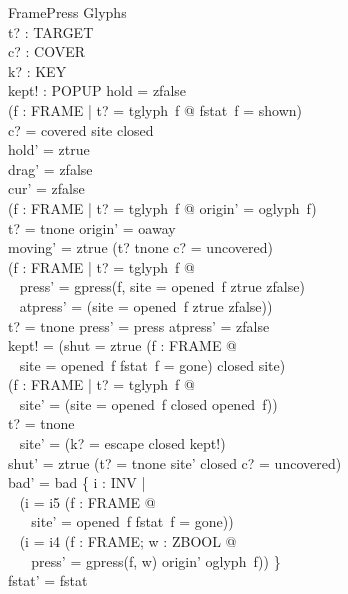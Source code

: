 \documentclass[a4paper,10pt,fleqn]{article}
\begin{document}
\begin{schema}{FramePress}
  \Delta Glyphs \\
  t? : TARGET \\
  c? : COVER \\
  k? : KEY \\
  kept! : POPUP
\where
  hold = zfalse \\
  (\forall f : FRAME | t? = tglyph~f @ fstat~f = shown) \\
  c? = covered \implies site \neq closed \\
  hold' = ztrue \\
  drag' = zfalse \\
  cur' = zfalse \\
  (\forall f : FRAME | t? = tglyph~f @ origin' = oglyph~f) \\
  t? = tnone \implies origin' = oaway \\
  moving' = ztrue \iff (t? \neq tnone \land c? = uncovered) \\
  (\forall f : FRAME | t? = tglyph~f @ \\
  \quad~ press' = gpress(f, \IF site = opened~f \THEN ztrue \ELSE zfalse) \\
  \quad~ \land atpress' = (\IF site = opened~f \THEN ztrue \ELSE zfalse)) \\
  t? = tnone \implies press' = press \land atpress' = zfalse \\
  kept! = (\IF shut = ztrue \lor (\exists f : FRAME @ \\
  \quad~ site = opened~f \land fstat~f = gone) \THEN closed \ELSE site) \\
  (\forall f : FRAME | t? = tglyph~f @ \\
  \quad~ site' = (\IF site = opened~f \THEN closed \ELSE opened~f)) \\
  t? = tnone \implies \\
  \quad~ site' = (\IF k? = escape \THEN closed \ELSE kept!) \\
  shut' = ztrue \iff (t? = tnone \land site' \neq closed \land c? = uncovered) \\
  bad' = bad \cup \{ i : INV | \\
  \quad~ (i = i5 \land (\exists f : FRAME @ \\
  \quad~ \quad~ site' = opened~f \land fstat~f = gone)) \\
  \quad~ \lor (i = i4 \land (\exists f : FRAME; w : ZBOOL @ \\
  \quad~ \quad~ press' = gpress(f, w) \land origin' \neq oglyph~f)) \} \\
  fstat' = fstat
\end{schema}
\end{document}
